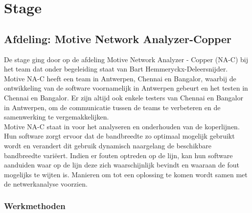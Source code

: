 \documentclass[10pt,a4paper]{article}
\begin{document}
\section{Stage}
\label{stage}
\subsection{Afdeling: Motive Network Analyzer-Copper}
\label{afdeling}
De stage ging door op de afdeling Motive Network Analyzer - Copper (NA-C) bij het team dat onder begeleiding staat van Bart Hemmeryckx-Deleersnijder. Motive NA-C heeft een team in Antwerpen, Chennai en Bangalor, waarbij de ontwikkeling van de software voornamelijk in Antwerpen gebeurt en het testen in Chennai en Bangalor. Er zijn altijd ook enkele testers van Chennai en Bangalor in Antwerpen, om de communicatie tussen de teams te verbeteren en de samenwerking te vergemakkelijken.\\
Motive NA-C staat in voor het analyseren en onderhouden van de koperlijnen. Hun software zorgt ervoor dat de bandbreedte zo optimaal mogelijk gebruikt wordt en verandert dit gebruik dynamisch naargelang de beschikbare bandbreedte vari\"eert. Indien er fouten optreden op de lijn, kan hun software aanduiden waar op de lijn deze zich waarschijnlijk bevindt en waaraan de fout mogelijks te wijten is. Manieren om tot een oplossing te komen wordt samen met de netwerkanalyse voorzien.
\subsubsection{Werkmethoden}
\label{methoden}
\end{document}
